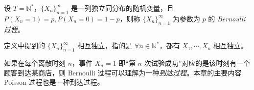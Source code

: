 \documentclass[../main.tex]{subfiles}
\begin{document}
\begin{definition}\label{def:6.1.1}
    设 $T=\mathbb N^*$，$\{X_n\}_{n=1}^\infty$ 是一列独立同分布的随机变量，且 $P(X_n=1)=p,P(X_n=0)=1-p$，则称 $\{X_n\}_{n=1}^\infty$ 为参数为 $p$ 的 \emph{Bernoulli 过程}。
\end{definition}

定义中提到的 $\{X_n\}_{n=1}^\infty$ 相互独立，指的是 $\forall n\in\mathbb N^*$，都有 $X_1,\cdots,X_n$ 相互独立。

如果在每个离散时刻 $n$，事件 $X_n=1$ 即“第 $n$ 次试验成功”对应的是该时刻有一个顾客到达某商店，则 Bernoulli 过程可以理解为一种\emph{到达过程}。本章的主要内容 Poisson 过程也是一种到达过程。
\end{document}
